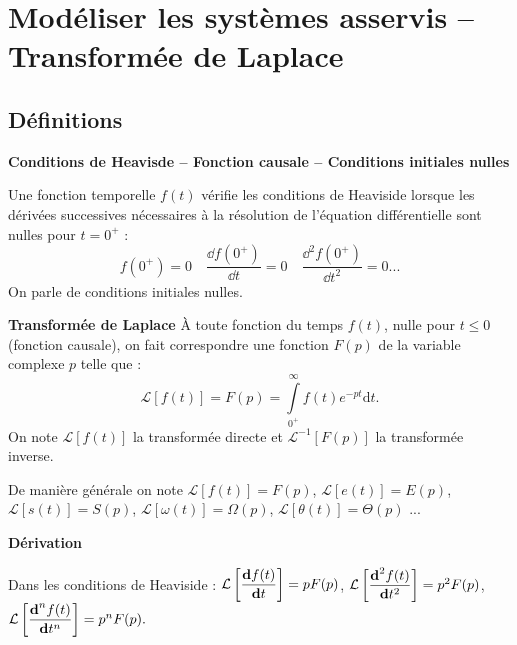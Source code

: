 
\section{Modéliser les systèmes asservis -- Transformée de Laplace}
\subsection{Définitions}

\begin{defi} \textbf{\textsf{Conditions de Heavisde -- Fonction causale -- Conditions initiales nulles}} 

Une fonction temporelle $f(t)$ vérifie les conditions de Heaviside lorsque les dérivées successives nécessaires à la résolution de l'équation différentielle sont nulles pour $t={0^{+}}$ :
$$
f({0^{+}})=0 \quad \dfrac{\dd f({0^{+}})}{\dd t} = 0 \quad \dfrac{\dd^2f({0^{+}})}{\dd t^2} = 0 ...
$$
On parle de conditions initiales nulles.
\end{defi}

\begin{defi} \textbf{\textsf{Transformée de Laplace}}
À toute fonction du temps $f(t)$, nulle pour $t\leq0$ (fonction causale), on fait correspondre une fonction $F(p)$ de la variable complexe $p$ telle que :
$$
\mathcal{L}\left[f(t)\right] = F(p)=\int\limits_{0^{+}}^\infty f(t)e^{-pt}\text{d}t.
$$
On note $\mathcal{L}\left[f(t)\right]$ la transformée directe et $\mathcal{L}^{-1}\left[F(p)\right]$ la transformée inverse.

De manière générale on note 
$\mathcal{L}\left[f(t)\right] = F(p)$,
$\mathcal{L}\left[e(t)\right] = E(p)$,
$\mathcal{L}\left[s(t)\right] = S(p)$,
$\mathcal{L}\left[\omega(t)\right] = \Omega(p)$,
$\mathcal{L}\left[\theta(t)\right] = \Theta(p)$ ...
\end{defi}




\begin{resultat} \textbf{\textsf{Dérivation}}

Dans les conditions de Heaviside :
$\mathcal{L}\left[ \dfrac{\text{\textbf{d}} f(t)}{\text{\textbf{d}} t}\right] =pF(p)$,
$\mathcal{L}\left[ \dfrac{\text{\textbf{d}}^2f(t)}{\text{\textbf{d}} t^2}\right] =p^2F(p) $,
$\mathcal{L}\left[ \dfrac{\text{\textbf{d}}^nf(t)}{\text{\textbf{d}} t^n}\right] =p^nF(p).$

\end{resultat}


